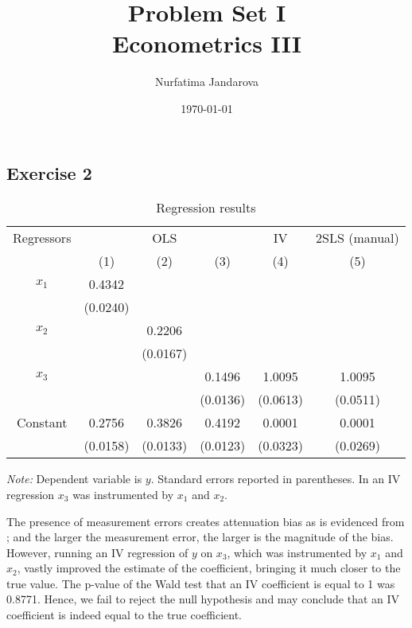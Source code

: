 \documentclass[]{article}
\title{Problem Set I \\ \large Econometrics III}
\author{Nurfatima Jandarova}
\date{\today}
\begin{document}
\maketitle

\subsection*{Exercise 2}
\begin{table}[h]
	\begin{center}
		\begin{threeparttable}
			\begin{tabular}{c|ccccc}
				Regressors & \multicolumn{3}{c}{OLS} & IV & 2SLS (manual) \\
						& (1) 		& (2) 		& (3) 		& (4) 		& (5) 		\\ \hline
				$x_1$ 	& 0.4342 	&  			&  			&  			&  			\\
						& (0.0240) 	& 			&  			&  			&  			\\
				$x_2$ 	&  			& 0.2206 	&  			&  			&  			\\
						&  			& (0.0167) 	&  			&  			&  			\\
				$x_3$ 	&  			&  			& 0.1496 	& 1.0095 	& 1.0095 	\\
						&			&  			& (0.0136) 	& (0.0613) 	& (0.0511) 	\\
				Constant& 0.2756 	& 0.3826 	& 0.4192 	& 0.0001 	& 0.0001 	\\
						& (0.0158) 	& (0.0133) 	& (0.0123) 	& (0.0323) 	& (0.0269) 
			\end{tabular}
			\begin{tablenotes}
				\textit{Note: }Dependent variable is $y$. Standard errors reported in parentheses. In an IV regression $x_3$ was instrumented by $x_1$ and $x_2$.
			\end{tablenotes}
		\end{threeparttable}
	\end{center}
	\caption{Regression results}
	\label{tab:ex2regres}
\end{table}

The presence of measurement errors creates attenuation bias as is evidenced from ; and the larger the measurement error, the larger is the magnitude of the bias. However, running an IV regression of $y$ on $x_3$, which was instrumented by $x_1$ and $x_2$, vastly improved the estimate of the coefficient, bringing it much closer to the true value. The p-value of the Wald test that an IV coefficient is equal to 1 was 0.8771. Hence, we fail to reject the null hypothesis and may conclude that an IV coefficient is indeed equal to the true coefficient.
\end{document}
